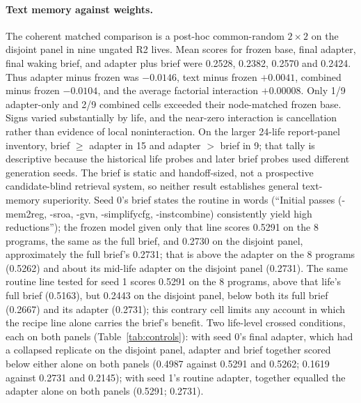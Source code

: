 \documentclass{article}
\begin{document}
\paragraph{Text memory against weights.} The coherent matched comparison is a post-hoc common-random $2\times2$ on the disjoint panel in nine ungated R2 lives. Mean scores for frozen base, final adapter, final waking brief, and adapter plus brief were 0.2528, 0.2382, 0.2570 and 0.2424. Thus adapter minus frozen was $-0.0146$, text minus frozen $+0.0041$, combined minus frozen $-0.0104$, and the average factorial interaction $+0.00008$. Only 1/9 adapter-only and 2/9 combined cells exceeded their node-matched frozen base. Signs varied substantially by life, and the near-zero interaction is cancellation rather than evidence of local noninteraction. On the larger 24-life report-panel inventory, brief $\ge$ adapter in 15 and adapter $>$ brief in 9; that tally is descriptive because the historical life probes and later brief probes used different generation seeds. The brief is static and handoff-sized, not a prospective candidate-blind retrieval system, so neither result establishes general text-memory superiority.
Seed 0's brief states the routine in words (``Initial passes (-mem2reg, -sroa, -gvn, -simplifycfg, -instcombine) consistently yield high reductions''); the frozen model given only that line scores 0.5291 on the 8 programs, the same as the full brief, and 0.2730 on the disjoint panel, approximately the full brief's 0.2731; that is above the adapter on the 8 programs (0.5262) and about its mid-life adapter on the disjoint panel (0.2731). The same routine line tested for seed 1 scores 0.5291 on the 8 programs, above that life's full brief (0.5163), but 0.2443 on the disjoint panel, below both its full brief (0.2667) and its adapter (0.2731); this contrary cell limits any account in which the recipe line alone carries the brief's benefit.
Two life-level crossed conditions, each on both panels (Table~\ref{tab:controls}): with seed 0's final adapter, which had a collapsed replicate on the disjoint panel, adapter and brief together scored below either alone on both panels (0.4987 against 0.5291 and 0.5262; 0.1619 against 0.2731 and 0.2145); with seed 1's routine adapter, together equalled the adapter alone on both panels (0.5291; 0.2731).
\end{document}
